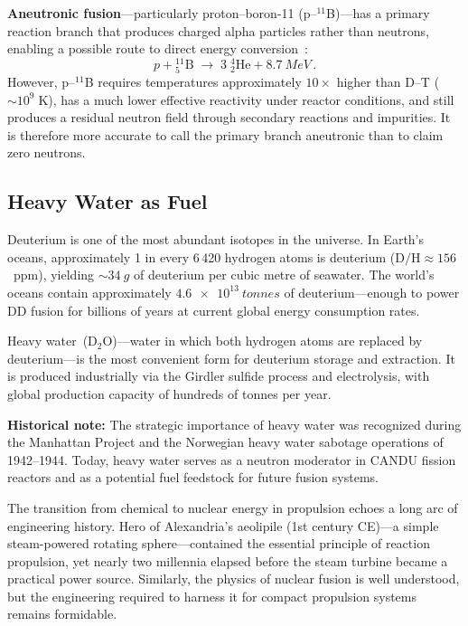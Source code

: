 \documentclass[aps,prd,twocolumn,superscriptaddress,nofootinbib,floatfix]{revtex4-2}
\begin{document}
\textbf{Aneutronic fusion}---particularly proton--boron-11
(p--$^{11}$B)---has a primary reaction branch that produces charged alpha
particles rather than neutrons, enabling a possible route to direct energy
conversion~\cite{DIRD_Teofilo}:
\begin{equation}\label{eq:pb11}
  p + {}^{11}_{5}\text{B}
  \;\longrightarrow\;
  3\;{}^{4}_{2}\text{He} + \SI{8.7}{MeV}\,.
\end{equation}
However, p--$^{11}$B requires temperatures approximately $10\times$ higher than
D--T (${\sim}10^{9}\;\text{K}$), has a much lower effective reactivity under
reactor conditions, and still produces a residual neutron field through secondary
reactions and impurities. It is therefore more accurate to call the primary branch
aneutronic than to claim zero neutrons.

\subsection{Heavy Water as Fuel}\label{sec:heavy-water}

Deuterium is one of the most abundant isotopes in the universe. In Earth's oceans,
approximately 1 in every 6\,420 hydrogen atoms is deuterium
($\text{D}/\text{H}\approx156$~ppm), yielding ${\sim}\SI{34}{g}$ of deuterium per
cubic metre of seawater. The world's oceans contain approximately
$\SI{4.6e13}{tonnes}$ of deuterium---enough to power DD fusion for billions of
years at current global energy consumption rates.

Heavy water~(D$_{2}$O)---water in which both hydrogen atoms are replaced by
deuterium---is the most convenient form for deuterium storage and extraction. It
is produced industrially via the Girdler sulfide process and electrolysis, with
global production capacity of hundreds of tonnes per year.

\textbf{Historical note:} The strategic importance of heavy water was recognized
during the Manhattan Project and the Norwegian heavy water sabotage operations of
1942--1944. Today, heavy water serves as a neutron moderator in CANDU fission
reactors and as a potential fuel feedstock for future fusion systems.

The transition from chemical to nuclear energy in propulsion echoes a long arc of
engineering history. Hero of Alexandria's aeolipile (1st century CE)---a simple
steam-powered rotating sphere---contained the essential principle of reaction
propulsion, yet nearly two millennia elapsed before the steam turbine became a
practical power source. Similarly, the physics of nuclear fusion is well
understood, but the engineering required to harness it for compact propulsion
systems remains formidable.
\end{document}
